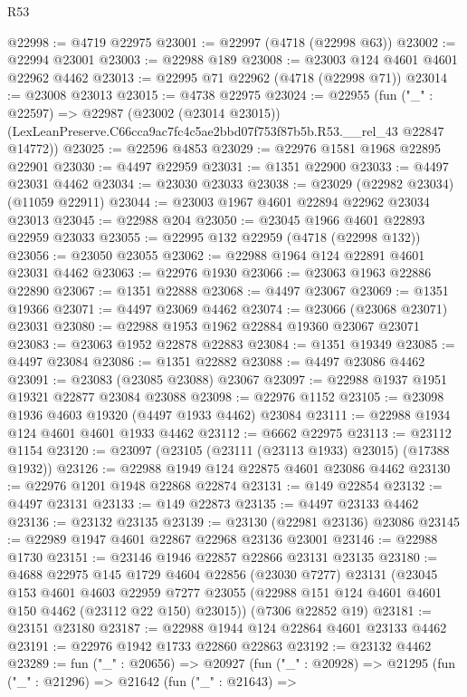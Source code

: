 \begin{lexlean}{R53}
\begin{coremodule}
@22998 := @4719 @22975
@23001 := @22997 (@4718 (@22998 @63))
@23002 := @22994 @23001
@23003 := @22988 @189
@23008 := @23003 @124 @4601 @4601 @22962 @4462
@23013 := @22995 @71 @22962 (@4718 (@22998 @71))
@23014 := @23008 @23013
@23015 := @4738 @22975
@23024 := @22955
    (fun ("_" : @22597) =>
    @22987
      (@23002 (@23014 @23015))
      (LexLeanPreserve.C66cca9ac7fc4c5ae2bbd07f753f87b5b.R53.__rel_43 @22847 @14772))
@23025 := @22596 @4853
@23029 := @22976 @1581 @1968 @22895 @22901
@23030 := @4497 @22959
@23031 := @1351 @22900
@23033 := @4497 @23031 @4462
@23034 := @23030 @23033
@23038 := @23029 (@22982 @23034) (@11059 @22911)
@23044 := @23003 @1967 @4601 @22894 @22962 @23034 @23013
@23045 := @22988 @204
@23050 := @23045 @1966 @4601 @22893 @22959 @23033
@23055 := @22995 @132 @22959 (@4718 (@22998 @132))
@23056 := @23050 @23055
@23062 := @22988 @1964 @124 @22891 @4601 @23031 @4462
@23063 := @22976 @1930
@23066 := @23063 @1963 @22886 @22890
@23067 := @1351 @22888
@23068 := @4497 @23067
@23069 := @1351 @19366
@23071 := @4497 @23069 @4462
@23074 := @23066 (@23068 @23071) @23031
@23080 := @22988 @1953 @1962 @22884 @19360 @23067 @23071
@23083 := @23063 @1952 @22878 @22883
@23084 := @1351 @19349
@23085 := @4497 @23084
@23086 := @1351 @22882
@23088 := @4497 @23086 @4462
@23091 := @23083 (@23085 @23088) @23067
@23097 := @22988 @1937 @1951 @19321 @22877 @23084 @23088
@23098 := @22976 @1152
@23105 := @23098 @1936 @4603 @19320 (@4497 @1933 @4462) @23084
@23111 := @22988 @1934 @124 @4601 @4601 @1933 @4462
@23112 := @6662 @22975
@23113 := @23112 @1154
@23120 := @23097 (@23105 (@23111 (@23113 @1933) @23015) (@17388 @1932))
@23126 := @22988 @1949 @124 @22875 @4601 @23086 @4462
@23130 := @22976 @1201 @1948 @22868 @22874
@23131 := @149 @22854
@23132 := @4497 @23131
@23133 := @149 @22873
@23135 := @4497 @23133 @4462
@23136 := @23132 @23135
@23139 := @23130 (@22981 @23136) @23086
@23145 := @22989 @1947 @4601 @22867 @22968 @23136 @23001
@23146 := @22988 @1730
@23151 := @23146 @1946 @22857 @22866 @23131 @23135
@23180 := @4688
    @22975
    @145
    @1729
    @4604
    @22856
    (@23030 @7277)
    @23131
    (@23045
      @153
      @4601
      @4603
      @22959
      @7277
      @23055
      (@22988 @151 @124 @4601 @4601 @150 @4462 (@23112 @22 @150) @23015))
    (@7306 @22852 @19)
@23181 := @23151 @23180
@23187 := @22988 @1944 @124 @22864 @4601 @23133 @4462
@23191 := @22976 @1942 @1733 @22860 @22863
@23192 := @23132 @4462
@23289 := fun ("_" : @20656) =>
  @20927
    (fun ("_" : @20928) =>
    @21295
      (fun ("_" : @21296) =>
      @21642
        (fun ("_" : @21643) =>

\end{coremodule}
\end{lexlean}
